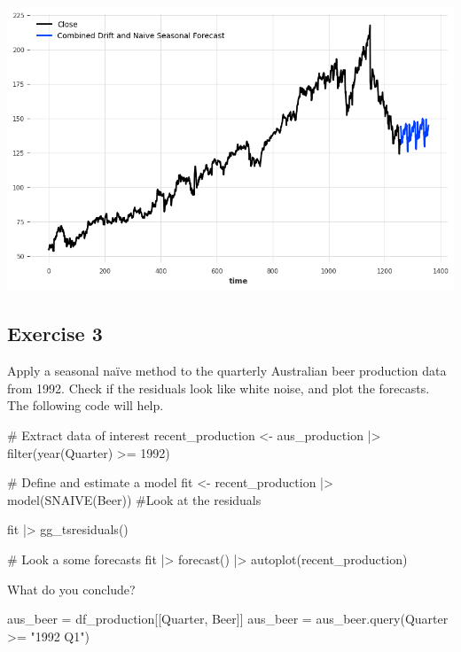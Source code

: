 \documentclass[
  11pt,
]{article}
\newenvironment{Shaded}{\begin{snugshade}}{\end{snugshade}}
\newcommand{\NormalTok}[1]{\textcolor[rgb]{0.00,0.23,0.31}{#1}}
\newcommand{\OperatorTok}[1]{\textcolor[rgb]{0.37,0.37,0.37}{#1}}
\newcommand{\StringTok}[1]{\textcolor[rgb]{0.13,0.47,0.30}{#1}}
\begin{document}
\includegraphics{hw3_files/figure-pdf/cell-32-output-1.png}

\subsection{Exercise 3}\label{exercise-3}

Apply a seasonal naïve method to the quarterly Australian beer
production data from 1992. Check if the residuals look like white noise,
and plot the forecasts. The following code will help.

\begin{Shaded}
\begin{Highlighting}[]
\NormalTok{\# Extract data of interest}
\NormalTok{recent\_production \textless{}{-} aus\_production |\textgreater{}}
\NormalTok{  filter(year(Quarter) \textgreater{}= 1992)}

\NormalTok{\# Define and estimate a model}
\NormalTok{fit \textless{}{-} recent\_production |\textgreater{} model(SNAIVE(Beer))}
\NormalTok{\#Look at the residuals}

\NormalTok{fit |\textgreater{} gg\_tsresiduals()}

\NormalTok{\# Look a some forecasts}
\NormalTok{fit |\textgreater{} forecast() |\textgreater{} autoplot(recent\_production)}
\end{Highlighting}
\end{Shaded}

What do you conclude?

\begin{Shaded}
\begin{Highlighting}[]
\NormalTok{aus\_beer }\OperatorTok{=}\NormalTok{ df\_production[[}\StringTok{\textquotesingle{}Quarter\textquotesingle{}}\NormalTok{, }\StringTok{\textquotesingle{}Beer\textquotesingle{}}\NormalTok{]]}
\NormalTok{aus\_beer }\OperatorTok{=}\NormalTok{ aus\_beer.query(}\StringTok{\textquotesingle{}Quarter \textgreater{}= "1992 Q1"\textquotesingle{}}\NormalTok{)}
\end{Highlighting}
\end{Shaded}
\end{document}
